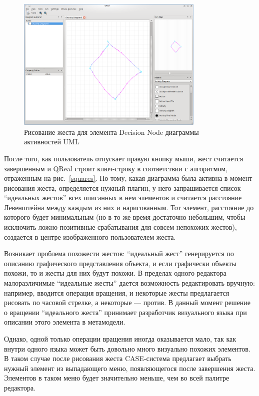 \documentclass[a5paper]{article}
\begin{document}
\begin{figure} [ht]
  \begin{center}
    \includegraphics[width=0.8\textwidth, bb=0 0 800 600]{05-drawing.png}
    \caption{Рисование жеста для элемента Decision Node диаграммы активностей UML}
    \label{drawing}
  \end{center}
\end{figure}

После того, как пользователь отпускает правую кнопку мыши, жест считается завершенным и QReal строит ключ-строку в соответствии с алгоритмом, отраженным на рис.~\ref{squares}. По тому, какая диаграмма была активна в момент рисования жеста, определяется нужный плагин, у него запрашивается список ``идеальных жестов'' всех описанных в нем элементов и считается расстояние Левенштейна между каждым из них и нарисованным. Тот элемент, расстояние до которого будет минимальным (но в то же время достаточно небольшим, чтобы исключить ложно-позитивные срабатывания для совсем непохожих жестов), создается в центре изображенного пользователем жеста. 

Возникает проблема похожести жестов: ``идеальный жест'' генерируется по описанию графического представления объекта, и если графически объекты похожи, то и жесты для них будут похожи. В пределах одного редактора малоразличимые ``идеальные жесты'' дается возможность редактировать вручную: например, вводится операция вращения, и некоторые жесты предлагается рисовать по часовой стрелке, а некоторые --- против. В данный момент решение о вращении ``идеального жеста'' принимает разработчик визуального языка при описании этого элемента в метамодели. 

Однако, одной только операции вращения иногда оказывается мало, так как внутри одного языка может быть довольно много визуально похожих элементов. В таком случае после рисования жеста CASE-система предлагает выбрать нужный элемент из выпадающего меню, появляющегося после завершения жеста. Элементов в таком меню будет значительно меньше, чем во всей палитре редактора.
\end{document}
